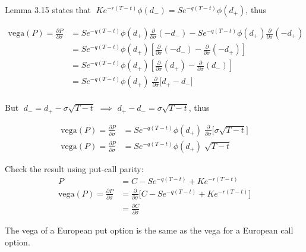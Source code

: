 \documentclass[letterpaper,12pt,fleqn]{article}
\theoremstyle{definition}
\begin{document}
\begin{enumerate}
Lemma 3.15 states that $\; K e^{-r(T - t)} \phi(d_{-}) = S e^{-q(T - t)} \phi(d_{+})$, thus

\begin{align*}
\mbox{vega}(P) = \frac{\partial P}{\partial \sigma} &= S e^{-q(T - t)} \phi(d_{+}) \frac{\partial}{\partial \sigma}(-d_{-}) - S e^{-q(T - t)} \phi(d_{+}) \frac{\partial}{\partial \sigma}(-d_{+}) \\
&= S e^{-q(T - t)} \phi(d_{+}) \left[ \frac{\partial}{\partial \sigma}(-d_{-}) -  \frac{\partial}{\partial \sigma}(-d_{+}) \right] \\
&= S e^{-q(T - t)} \phi(d_{+}) \left[ \frac{\partial}{\partial \sigma}(d_{+}) -  \frac{\partial}{\partial \sigma}(d_{-}) \right] \\
&= S e^{-q(T - t)} \phi(d_{+}) \; \frac{\partial}{\partial \sigma} \bigg[ d_{+} -  d_{-} \bigg] \\
\end{align*}

But $\; d_{-} = d_{+} - \sigma \sqrt{T - t}$ $\implies$ $d_{+} - d_{-} = \sigma \sqrt{T - t}$, thus

\begin{align*}
\mbox{vega}(P) = \frac{\partial P}{\partial \sigma} &= S e^{-q(T - t)} \phi(d_{+}) \; \frac{\partial}{\partial \sigma} \bigg[ \sigma \sqrt{T - t} \bigg] \\
\mbox{vega}(P) = \frac{\partial P}{\partial \sigma} &= S e^{-q(T - t)} \phi(d_{+}) \; \sqrt{T - t}
\end{align*}

\vspace{2em}

Check the result using put-call parity:
\begin{align*}
P &= C - Se^{-q(T - t)} + Ke^{-r(T - t)} \\
\mbox{vega}(P) = \frac{\partial P}{\partial \sigma} &= \frac{\partial}{\partial \sigma} \big[ C - Se^{-q(T - t)} + Ke^{-r(T - t)} \big] \\
&= \frac{\partial C}{\partial \sigma}
\end{align*}

The vega of a European put option is the same as the vega for a European call option.




\end{enumerate}
\end{document}
